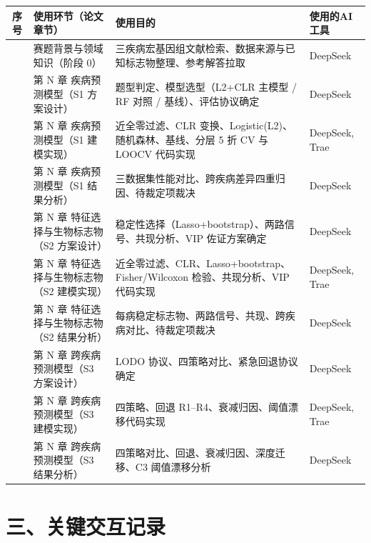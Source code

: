 \documentclass[12pt,a4paper]{ctexart}
\begin{document}
\begin{longtable}{|c|p{3.2cm}|p{6.2cm}|p{2.6cm}|}
\hline
序号 & 使用环节（论文章节） & 使用目的 & 使用的AI工具 \\
\hline
[AI-1-1] & 赛题背景与领域知识（阶段 0） & 三疾病宏基因组文献检索、数据来源与已知标志物整理、参考解答拉取 & DeepSeek \\
\hline
[AI-1-2] & 第 N 章 疾病预测模型（S1 方案设计） & 题型判定、模型选型（L2+CLR 主模型 / RF 对照 / 基线）、评估协议确定 & DeepSeek \\
\hline
[AI-1-3] & 第 N 章 疾病预测模型（S1 建模实现） & 近全零过滤、CLR 变换、Logistic(L2)、随机森林、基线、分层 5 折 CV 与 LOOCV 代码实现 & DeepSeek, Trae \\
\hline
[AI-1-4] & 第 N 章 疾病预测模型（S1 结果分析） & 三数据集性能对比、跨疾病差异四重归因、待裁定项裁决 & DeepSeek \\
\hline
[AI-2-1] & 第 N 章 特征选择与生物标志物（S2 方案设计） & 稳定性选择（Lasso+bootstrap）、两路信号、共现分析、VIP 佐证方案确定 & DeepSeek \\
\hline
[AI-2-2] & 第 N 章 特征选择与生物标志物（S2 建模实现） & 近全零过滤、CLR、Lasso+bootstrap、Fisher/Wilcoxon 检验、共现分析、VIP 代码实现 & DeepSeek, Trae \\
\hline
[AI-2-3] & 第 N 章 特征选择与生物标志物（S2 结果分析） & 每病稳定标志物、两路信号、共现、跨疾病对比、待裁定项裁决 & DeepSeek \\
\hline
[AI-3-1] & 第 N 章 跨疾病预测模型（S3 方案设计） & LODO 协议、四策略对比、紧急回退协议确定 & DeepSeek \\
\hline
[AI-3-2] & 第 N 章 跨疾病预测模型（S3 建模实现） & 四策略、回退 R1--R4、衰减归因、阈值漂移代码实现 & DeepSeek, Trae \\
\hline
[AI-3-3] & 第 N 章 跨疾病预测模型（S3 结果分析） & 四策略对比、回退、衰减归因、深度迁移、C3 阈值漂移分析 & DeepSeek \\
\hline
\end{longtable}

\section*{三、关键交互记录}
\end{document}
